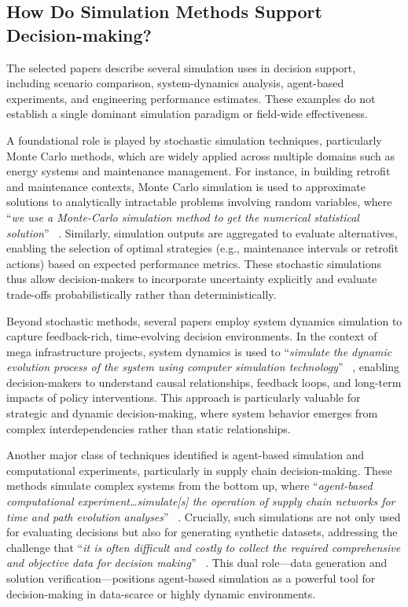 \documentclass{sfuthesis}
\begin{document}
\subsection{How Do Simulation Methods Support Decision-making?}
The selected papers describe several simulation uses in decision support, including scenario comparison, system-dynamics analysis, agent-based experiments, and engineering performance estimates. These examples do not establish a single dominant simulation paradigm or field-wide effectiveness.\par
A foundational role is played by stochastic simulation techniques, particularly Monte Carlo methods, which are widely applied across multiple domains such as energy systems and maintenance management. For instance, in building retrofit and maintenance contexts, Monte Carlo simulation is used to approximate solutions to analytically intractable problems involving random variables, where “\textit{we use a Monte-Carlo simulation method to get the numerical statistical solution}” ~\cite{Ma2020EquipmentMaintenance}. Similarly, simulation outputs are aggregated to evaluate alternatives, enabling the selection of optimal strategies (e.g., maintenance intervals or retrofit actions) based on expected performance metrics. These stochastic simulations thus allow decision-makers to incorporate uncertainty explicitly and evaluate trade-offs probabilistically rather than deterministically.\par
 Beyond stochastic methods, several papers employ system dynamics simulation to capture feedback-rich, time-evolving decision environments. In the context of mega infrastructure projects, system dynamics is used to “\textit{simulate the dynamic evolution process of the system using computer simulation technology}” ~\cite{Hu2023MegaInfrastructure}, enabling decision-makers to understand causal relationships, feedback loops, and long-term impacts of policy interventions. This approach is particularly valuable for strategic and dynamic decision-making, where system behavior emerges from complex interdependencies rather than static relationships.\par
Another major class of techniques identified is agent-based simulation and computational experiments, particularly in supply chain decision-making. These methods simulate complex systems from the bottom up, where “\textit{agent-based computational experiment…simulate[s] the operation of supply chain networks for time and path evolution analyses}” ~\cite{long2018data}. Crucially, such simulations are not only used for evaluating decisions but also for generating synthetic datasets, addressing the challenge that “\textit{it is often difficult and costly to collect the required comprehensive and objective data for decision making}” ~\cite{long2018data}. This dual role—data generation and solution verification—positions agent-based simulation as a powerful tool for decision-making in data-scarce or highly dynamic environments.\par
\end{document}
